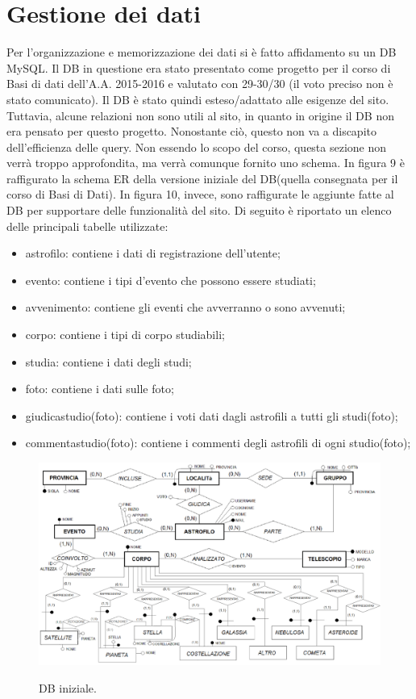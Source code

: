 	\section{Gestione dei dati}
	Per l'organizzazione e memorizzazione dei dati si è fatto affidamento su un DB MySQL. Il DB in questione era stato presentato come progetto per il corso di Basi di dati dell'A.A. 2015-2016 e valutato con 29-30/30 (il voto preciso non è stato comunicato). Il DB è stato quindi esteso/adattato alle esigenze del sito. Tuttavia, alcune relazioni non sono utili al sito, in quanto in origine il DB non era pensato per questo progetto. Nonostante ciò, questo non va a discapito dell'efficienza delle query. Non essendo lo scopo del corso, questa sezione non verrà troppo approfondita, ma verrà comunque fornito uno schema.
	In figura 9 è raffigurato la schema ER della versione iniziale del DB(quella consegnata per il corso di Basi di Dati). In figura 10, invece, sono raffigurate le aggiunte fatte al DB per supportare delle funzionalità del sito.
	Di seguito è riportato un elenco delle principali tabelle utilizzate:
	\newpage
	\begin{itemize}
		\item astrofilo: contiene i dati di registrazione dell'utente;
		\item evento: contiene i tipi d'evento che possono essere studiati;
		\item avvenimento: contiene gli eventi che avverranno o sono avvenuti;
		\item corpo: contiene i tipi di corpo studiabili;
		\item studia: contiene i dati degli studi;
		\item foto: contiene i dati sulle foto;
		\item giudicastudio(foto): contiene i voti dati dagli astrofili a tutti gli studi(foto);
		\item commentastudio(foto): contiene i commenti degli astrofili di ogni studio(foto);
	\end{itemize}
	\begin{figure}
		\includegraphics[scale=0.2]{images/ERR-FINITO.png}\\[1cm] \caption{DB iniziale.}
	\end{figure}

